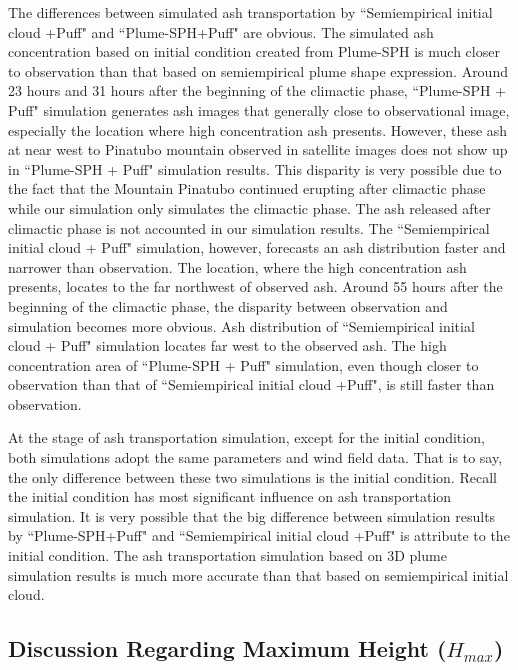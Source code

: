 \documentclass[draft,linenumbers]{agujournal2019}
\begin{document}
\begin{figure}[!htb]
    \label{fig:Plume-SPH-Puff-ash-cloud}
\end{figure}

The differences between simulated ash transportation by ``Semiempirical initial cloud +Puff" and ``Plume-SPH+Puff" are obvious. The simulated ash concentration based on initial condition created from Plume-SPH is much closer to observation than that based on semiempirical plume shape expression. Around 23 hours and 31 hours after the beginning of the climactic phase, ``Plume-SPH + Puff" simulation generates ash images that generally close to observational image, especially the location where high concentration ash presents. However, these ash at near west to Pinatubo mountain observed in satellite images does not show up in ``Plume-SPH + Puff" simulation results. This disparity is very possible due to the fact that the Mountain Pinatubo continued erupting after climactic phase while our simulation only simulates the climactic phase. The ash released after climactic phase is not accounted in our simulation results. The ``Semiempirical initial cloud + Puff" simulation, however, forecasts an ash distribution faster and narrower than observation. The location, where the high concentration ash presents, locates to the far northwest of observed ash. 
Around 55 hours after the beginning of the climactic phase, the disparity between observation and simulation becomes more obvious. Ash distribution of ``Semiempirical initial cloud + Puff" simulation locates far west to the observed ash. The high concentration area of ``Plume-SPH + Puff" simulation, even though closer to observation than that of ``Semiempirical initial cloud +Puff", is still faster than observation.

At the stage of ash transportation simulation, except for the initial condition, both simulations adopt the same parameters and wind field data. That is to say, the only difference between these two simulations is the initial condition. Recall the initial condition has most significant influence on ash transportation simulation. It is very possible that the big difference between simulation results by ``Plume-SPH+Puff" and ``Semiempirical initial cloud +Puff" is attribute to the initial condition. The ash transportation simulation based on 3D plume simulation results is much more accurate than that based on semiempirical initial cloud.

\subsection{Discussion Regarding Maximum Height ($H_{max}$)}
\end{document}
